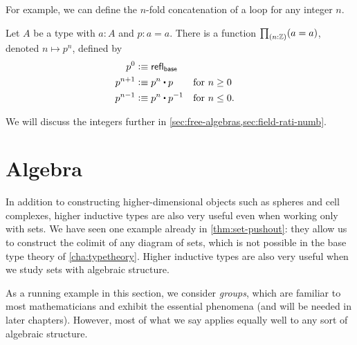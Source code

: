 For example, we can define the $n$-fold concatenation of a loop for any integer $n$.

\begin{cor}\label{thm:looptothe}
  Let $A$ be a type with $a:A$ and $p:a=a$.
  There is a function $\prd{n:\Z} (a=a)$, denoted $n\mapsto p^n$, defined by
  \begin{align*}
    p^0 &\defeq \refl{\base}\\
    p^{n+1} &\defeq p^n \ct p
    & &\text{for $n\ge 0$}\\
    p^{n-1} &\defeq p^n \ct \opp p
    & &\text{for $n\le 0$.}
  \end{align*}
\end{cor}

We will discuss the integers further in \autoref{sec:free-algebras,sec:field-rati-numb}.

%

\section{Algebra}
\label{sec:free-algebras}

In addition to constructing higher-dimensional objects such as spheres and cell complexes, higher inductive types are also very useful even when working only with sets.
We have seen one example already in \autoref{thm:set-pushout}: they allow us to construct the colimit of any diagram of sets, which is not possible in the base type theory of \autoref{cha:typetheory}.
Higher inductive types are also very useful when we study sets with algebraic structure.

As a running example in this section, we consider \emph{groups}, which are familiar to most mathematicians and exhibit the essential phenomena (and will be needed in later chapters).
However, most of what we say applies equally well to any sort of algebraic structure.

